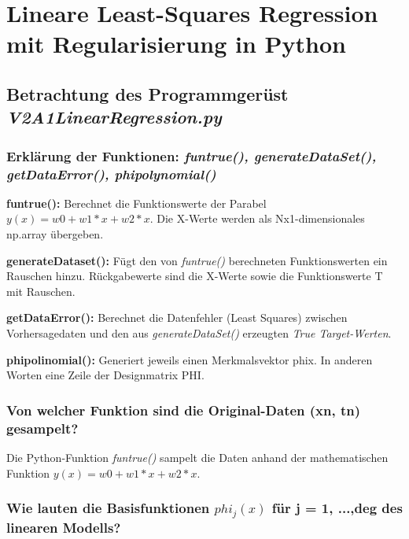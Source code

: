 \section{Lineare Least-Squares Regression mit Regularisierung in Python}


\subsection{
    Betrachtung des Programmgerüst \textit{V2A1\textunderscore LinearRegression.py}
}

\subsubsection{Erklärung der Funktionen: \textit{fun\textunderscore true(), generateDataSet(), getDataError(), phi\textunderscore polynomial()}}

\textbf{fun\textunderscore true():} Berechnet die Funktionswerte der Parabel
$y(x) = w0 + w1*x + w2*x$. Die X-Werte werden als Nx1-dimensionales np.array übergeben.

\noindent
\vspace{5px}
\textbf{generateDataset():} Fügt den von \textit{fun\textunderscore true()} berechneten Funktionswerten ein Rauschen hinzu. Rückgabewerte sind die X-Werte sowie die Funktionswerte T mit Rauschen.

\noindent
\vspace{5px}
\textbf{getDataError():} Berechnet die Datenfehler (Least Squares) zwischen Vorhersagedaten und den aus \textit{generateDataSet()} erzeugten \textit{True Target-Werten}.

\noindent
\vspace{5px}
\textbf{phi\textunderscore polinomial():} Generiert jeweils einen Merkmalsvektor phi\textunderscore x. In anderen Worten eine Zeile der Designmatrix PHI.

\subsubsection{Von welcher Funktion sind die Original-Daten (xn, tn) gesampelt?}

Die Python-Funktion \textit{fun\textunderscore true()} sampelt die Daten anhand der mathematischen Funktion $y(x) = w0 + w1*x + w2*x$.

\subsubsection{Wie lauten die Basisfunktionen $phi_j(x)$ für j = 1, ...,deg des linearen Modells?}

